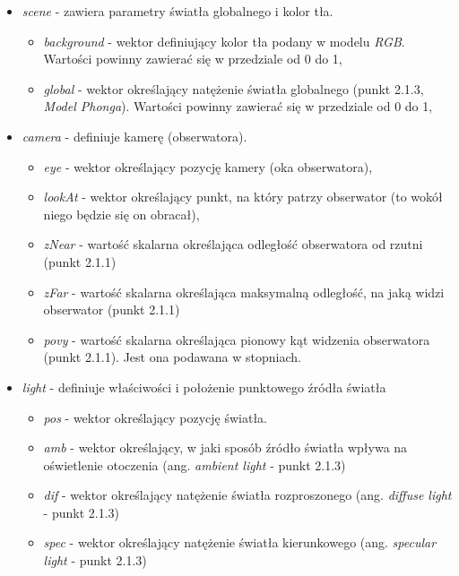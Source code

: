 \begin{itemize}

\item \emph{scene} - zawiera parametry światła globalnego i kolor tła.
	\begin{itemize}
		\item \emph{background} - wektor definiujący kolor tła podany w modelu \emph{RGB}. Wartości powinny zawierać się w przedziale od 0 do 1,
		\item \emph{global} -  wektor określający natężenie światła globalnego (punkt 2.1.3, \emph{Model Phonga}). Wartości powinny zawierać się w przedziale od 0 do 1,
	\end{itemize}
	
\item \emph{camera} - definiuje kamerę (obserwatora).

	\begin{itemize}
		\item \emph{eye} - wektor określający pozycję kamery (oka obserwatora),
		\item \emph{lookAt} - wektor określający punkt, na który patrzy obserwator (to wokół niego będzie się on obracał),
		\item \emph{zNear} - wartość skalarna określająca odległość obserwatora od rzutni (punkt 2.1.1)
		\item \emph{zFar} -	wartość skalarna określająca maksymalną odległość, na jaką widzi obserwator (punkt 2.1.1)
		\item \emph{povy} -	wartość skalarna określająca pionowy kąt widzenia obserwatora (punkt 2.1.1). Jest ona podawana w stopniach.
	\end{itemize}

\item \emph{light} - definiuje właściwości i położenie punktowego źródła światła

	\begin{itemize}
		\item \emph{pos} - wektor określający pozycję światła.
		\item \emph{amb} - wektor określający, w jaki sposób źródło światła wpływa na oświetlenie otoczenia (ang. \emph{ambient light} - punkt 2.1.3)
		\item \emph{dif} - wektor określający natężenie światła rozproszonego (ang. \emph{diffuse light} - punkt 2.1.3)
		\item \emph{spec} - wektor określający natężenie światła kierunkowego (ang. \emph{specular light} - punkt 2.1.3)
	\end{itemize}


\end{itemize}
